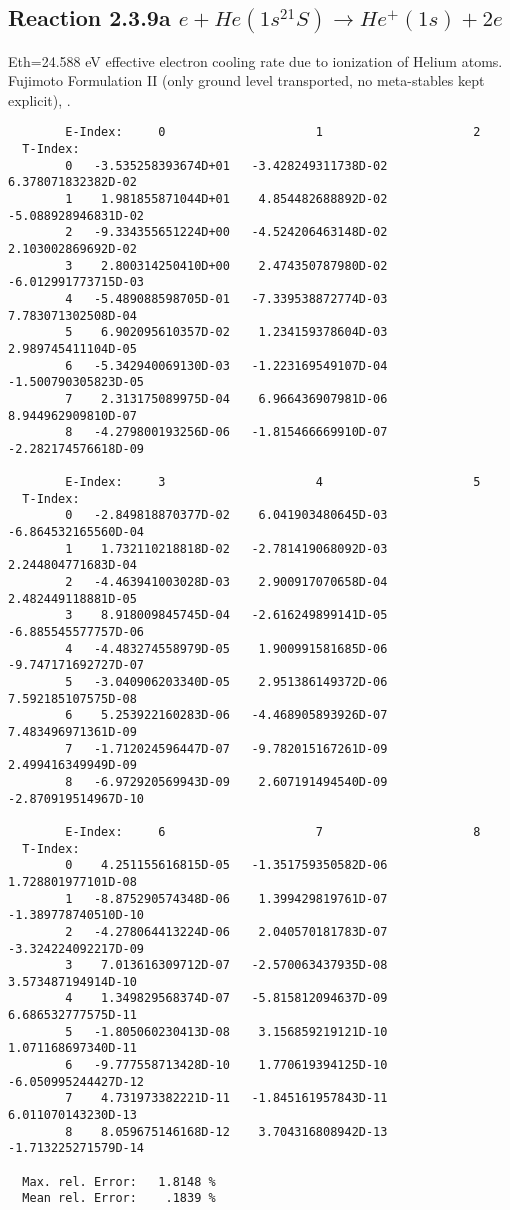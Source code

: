 \documentclass[12pt,dvipdfmx]{article}
\begin{document}
\subsection{
Reaction 2.3.9a $e + He(1s^21S) \rightarrow He^+(1s) + 2e$
}
Eth=24.588 eV
   effective electron cooling rate due to ionization of Helium atoms.
Fujimoto Formulation II (only ground level transported, no meta-stables
 kept explicit), \cite{kn:Fujimoto}.

\begin{small}\begin{verbatim}
        E-Index:     0                     1                     2
  T-Index:
        0   -3.535258393674D+01   -3.428249311738D-02    6.378071832382D-02
        1    1.981855871044D+01    4.854482688892D-02   -5.088928946831D-02
        2   -9.334355651224D+00   -4.524206463148D-02    2.103002869692D-02
        3    2.800314250410D+00    2.474350787980D-02   -6.012991773715D-03
        4   -5.489088598705D-01   -7.339538872774D-03    7.783071302508D-04
        5    6.902095610357D-02    1.234159378604D-03    2.989745411104D-05
        6   -5.342940069130D-03   -1.223169549107D-04   -1.500790305823D-05
        7    2.313175089975D-04    6.966436907981D-06    8.944962909810D-07
        8   -4.279800193256D-06   -1.815466669910D-07   -2.282174576618D-09

        E-Index:     3                     4                     5
  T-Index:
        0   -2.849818870377D-02    6.041903480645D-03   -6.864532165560D-04
        1    1.732110218818D-02   -2.781419068092D-03    2.244804771683D-04
        2   -4.463941003028D-03    2.900917070658D-04    2.482449118881D-05
        3    8.918009845745D-04   -2.616249899141D-05   -6.885545577757D-06
        4   -4.483274558979D-05    1.900991581685D-06   -9.747171692727D-07
        5   -3.040906203340D-05    2.951386149372D-06    7.592185107575D-08
        6    5.253922160283D-06   -4.468905893926D-07    7.483496971361D-09
        7   -1.712024596447D-07   -9.782015167261D-09    2.499416349949D-09
        8   -6.972920569943D-09    2.607191494540D-09   -2.870919514967D-10

        E-Index:     6                     7                     8
  T-Index:
        0    4.251155616815D-05   -1.351759350582D-06    1.728801977101D-08
        1   -8.875290574348D-06    1.399429819761D-07   -1.389778740510D-10
        2   -4.278064413224D-06    2.040570181783D-07   -3.324224092217D-09
        3    7.013616309712D-07   -2.570063437935D-08    3.573487194914D-10
        4    1.349829568374D-07   -5.815812094637D-09    6.686532777575D-11
        5   -1.805060230413D-08    3.156859219121D-10    1.071168697340D-11
        6   -9.777558713428D-10    1.770619394125D-10   -6.050995244427D-12
        7    4.731973382221D-11   -1.845161957843D-11    6.011070143230D-13
        8    8.059675146168D-12    3.704316808942D-13   -1.713225271579D-14

  Max. rel. Error:   1.8148 %
  Mean rel. Error:    .1839 %

\end{verbatim}\end{small}
\end{document}

